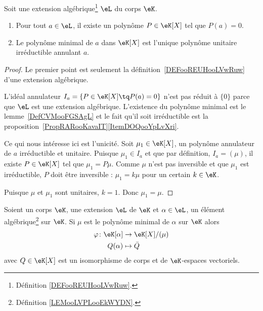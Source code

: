 \begin{proposition}      \label{PROPooALFJooDjmIcb}
	Soit une extension algébrique\footnote{Définition \ref{DEFooREUHooLVwRuw}.} \( \eL\) du corps \( \eK\).
	\begin{enumerate}
		\item
		      Pour tout \( a\in \eL\), il existe un polynôme \( P\in \eK[X]\) tel que \( P(a)=0\).
		\item       \label{ITEMooEFNFooKYqXDk}
		      Le polynôme minimal de \( a\) dans \( \eK[X]\) est l'unique polynôme unitaire irréductible annulant \( a\).
	\end{enumerate}
\end{proposition}

\begin{proof}
	Le premier point est seulement la définition~\ref{DEFooREUHooLVwRuw} d'une extension algébrique.

	L'idéal annulateur \( I_a=\{ P\in \eK[X]\tq P(a)=0 \}\) n'est pas réduit à \( \{ 0 \}\) parce que \( \eL\) est une extension algébrique. L'existence du polynôme minimal est le lemme~\ref{DefCVMooFGSAgL} et le fait qu'il soit irréductible est la proposition~\ref{PropRARooKavaIT}\ref{ItemDOQooYpLvXri}.

	Ce qui nous intéresse ici est l'unicité. Soit \( \mu_1\in \eK[X]\), un polynôme annulateur de \( a\) irréductible et unitaire. Puisque \( \mu_1\in I_a\) et que par définition, \( I_a=(\mu)\), il existe \( P\in \eK[X]\) tel que \( \mu_1=P\mu\). Comme \( \mu\) n'est pas inversible et que \( \mu_1\) est irréductible, \( P\) doit être inversible : \( \mu_1=k\mu\) pour un certain \( k\in \eK\).

	Puisque \( \mu\) et \( \mu_1\) sont unitaires, \( k=1\). Donc \( \mu_1=\mu\).
\end{proof}

\begin{lemma}       \label{LEMooHKTMooKEoOuK}
	Soient un corps \( \eK\), une extension \( \eL\) de \( \eK\) et \( \alpha\in \eL\), un élément algébrique\footnote{Définition \ref{LEMooLVPLooEkWYDN}.} sur \( \eK\). Si \( \mu\) est le polynôme minimal de \( \alpha\) sur \( \eK\) alors
	\begin{equation}
		\begin{aligned}
			\varphi\colon \eK[\alpha] & \to \eK[X]/(\mu) \\
			Q(\alpha)                 & \mapsto \bar Q
		\end{aligned}
	\end{equation}
	avec \( Q\in\eK[X]\) est un isomorphisme de corps et de \( \eK\)-espaces vectoriels.
\end{lemma}

